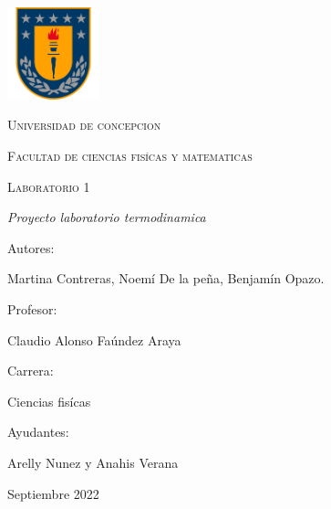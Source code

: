 \documentclass[]{article}
\begin{document}
\begin{titlepage}
      \begin{center}     
              
            \includegraphics[width=0.2\textwidth]{graficos/escudo_udec.png}                       %
            
            
            
            \vspace{1cm}
            \textsc{{\LARGE Universidad de concepcion}}
            
            \vspace{1cm}
            {\scshape\Large Facultad de ciencias fisícas y matematicas \par}
            \vspace{2cm}
            {\scshape\Huge Laboratorio 1 \par}
            \vspace{2cm}
            {\itshape\Large Proyecto laboratorio termodinamica \par}
            \vfill
            {\Large Autores: \par}
            {\Large Martina Contreras, Noemí De la peña, Benjamín Opazo. \par}
            \vfill
            \vfill
            {\Large Profesor: \par}
            {\Large Claudio Alonso Faúndez Araya \par}
            \vfill
            \vfill
            {\Large Carrera: \par}
            {\Large Ciencias fisícas \par}
            \vfill
            \vfill
            {\Large Ayudantes: \par}
            {\Large Arelly Nunez y Anahis Verana \par}
            \vfill
            {\Large Septiembre 2022 \par}
      \end{center}
\end{titlepage}            
\end{document}
